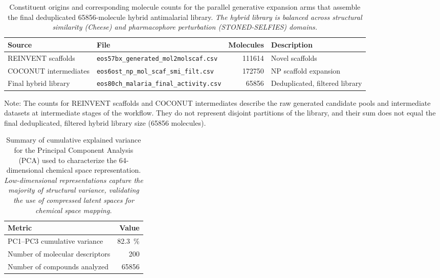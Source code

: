 \documentclass[journal=jcisd8,manuscript=suppinfo]{achemso}
\begin{document}
\begin{table}[htbp]
\centering
\caption{Constituent origins and corresponding molecule counts for the parallel generative expansion arms that assemble the final deduplicated \num{65856}-molecule hybrid antimalarial library. \textit{The hybrid library is balanced across structural similarity (Cheese) and pharmacophore perturbation (STONED-SELFIES) domains.}}
\label{tab:source_breakdown}
\small
\begin{tabular}{@{}l p{5cm} r l@{}}
\toprule
\textbf{Source} & \textbf{File} & \textbf{Molecules} & \textbf{Description} \\
\midrule
REINVENT scaffolds & \texttt{eos57bx\_generated\_mol2molscaf.csv} & \num{111614} & Novel scaffolds \\
COCONUT intermediates & \texttt{eos6ost\_np\_mol\_scaf\_smi\_filt.csv} & \num{172750} & NP scaffold expansion \\
Final hybrid library & \texttt{eos80ch\_malaria\_final\_activity.csv} & \num{65856} & Deduplicated, filtered library \\
\bottomrule
\end{tabular}
\begin{footnotesize}
Note: The counts for REINVENT scaffolds and COCONUT intermediates describe the raw generated candidate pools and intermediate datasets at intermediate stages of the workflow. They do not represent disjoint partitions of the library, and their sum does not equal the final deduplicated, filtered hybrid library size (\num{65856} molecules).
\end{footnotesize}
\end{table}

\begin{table}[htbp]
\centering
\caption{Summary of cumulative explained variance for the Principal Component Analysis (PCA) used to characterize the \num{64}-dimensional chemical space representation. \textit{Low-dimensional representations capture the majority of structural variance, validating the use of compressed latent spaces for chemical space mapping.}}
\label{tab:pca_variance}
\begin{tabular}{@{}l r@{}}
\toprule
\textbf{Metric} & \textbf{Value} \\
\midrule
PC1--PC3 cumulative variance & \qty{82.3}{\percent} \\
Number of molecular descriptors & \num{200} \\
Number of compounds analyzed & \num{65856} \\
\bottomrule
\end{tabular}
\end{table}
\end{document}
